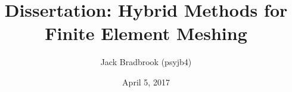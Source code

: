\documentclass{article}
\begin{document}

\title{Dissertation: Hybrid Methods for Finite Element Meshing}
\author{Jack Bradbrook (psyjb4)}
\date{April 5, 2017}
\maketitle

\tableofcontents

\newpage










\end{document}
